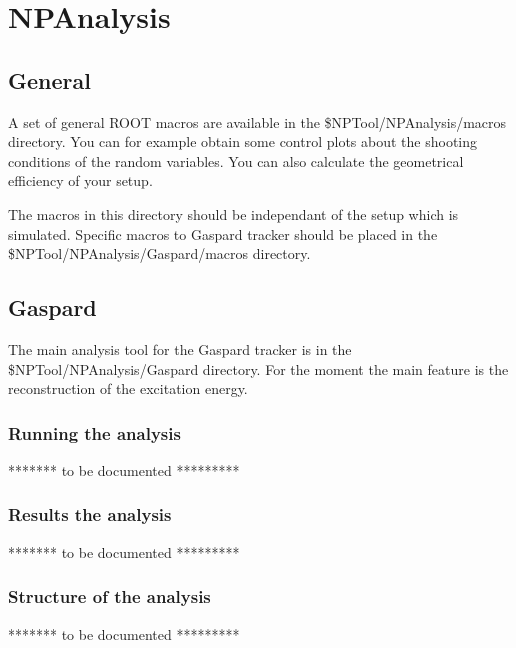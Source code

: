\documentclass[a4paper,12pt]{article}
\begin{document}
\section{NPAnalysis}
\subsection{General}
A set of general ROOT macros are available in the \$NPTool/NPAnalysis/macros 
directory. You can for example obtain some control plots about the shooting
conditions of the random variables. You can also calculate the geometrical 
efficiency of your setup.

The macros in this directory should be independant of the setup which is simulated.
Specific macros to Gaspard tracker should be placed in the 
\$NPTool/NPAnalysis/Gaspard/macros directory.


\subsection{Gaspard}
The main analysis tool for the Gaspard tracker is in the \$NPTool/NPAnalysis/Gaspard
directory. For the moment the main feature is the reconstruction of the excitation 
energy.

\subsubsection{Running the analysis}
******* to be documented *********

\subsubsection{Results the analysis}
******* to be documented *********

\subsubsection{Structure of the analysis}
******* to be documented *********
\end{document}
